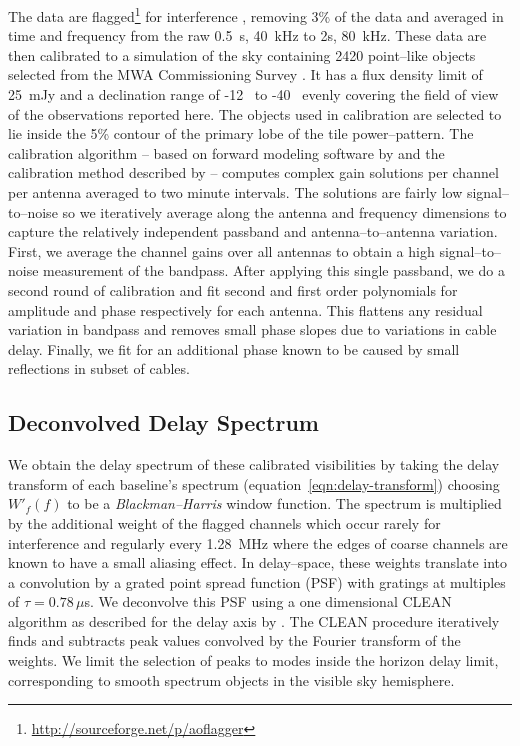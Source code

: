 \documentclass[preprint2,iop,numberedappendix]{emulateapj}
\begin{document}
The data are flagged\footnote{\url{http://sourceforge.net/p/aoflagger}} for interference \citep{off10,off12}, removing 3\% of the data and averaged in time  and frequency from the raw 0.5~s, 40~kHz to 2s, 80~kHz. These data are then calibrated to a simulation of the sky containing 2420 point--like objects selected from the MWA Commissioning Survey \citep[MWACS;][]{hur14}. %
It has a flux density limit of 25~mJy and a declination range of -12\arcdeg~ to -40\arcdeg~ evenly covering the field of view of the observations reported here. The objects used in calibration are selected to lie inside the 5\% contour of the primary lobe of the tile power--pattern. The calibration algorithm -- based on forward modeling software by \citet{sul12} and the calibration method described by \citet{sal14} -- computes complex gain solutions per channel per antenna averaged to two minute intervals. The solutions are fairly low signal--to--noise so we iteratively average along the antenna and frequency dimensions to capture the relatively independent passband and antenna--to--antenna variation. First, we average the channel gains over all antennas to obtain a high signal--to--noise measurement of the bandpass. After applying this single passband, we do a second round of calibration and fit second and first order polynomials for amplitude and phase respectively for each antenna. This flattens any residual variation in bandpass and removes small phase slopes due to variations in cable delay. Finally, we fit for an additional phase known to be caused by small reflections in subset of cables. 

\subsection{Deconvolved Delay Spectrum}\label{sec:data-delay-spectrum}

We obtain the delay spectrum of these calibrated visibilities by taking the delay transform of each baseline's spectrum (equation~\ref{eqn:delay-transform}) choosing $W'_f(f)$ to be a {\it Blackman--Harris} window function. The spectrum is multiplied by the additional weight of the flagged channels which occur rarely for interference and regularly every 1.28~MHz where the edges of coarse channels are known to have a small aliasing effect. In delay--space, these weights translate into a convolution by a grated point spread function (PSF) with gratings at multiples of $\tau=0.78\,\mu$s. We deconvolve this PSF using a one dimensional CLEAN algorithm \citep{tay99} as described for the delay axis by \citet{par09,par12}. The CLEAN procedure iteratively finds and subtracts peak values convolved by the Fourier transform of the weights. We limit the selection of peaks to modes inside the horizon delay limit, corresponding to smooth spectrum objects in the visible sky hemisphere. 
\end{document}
